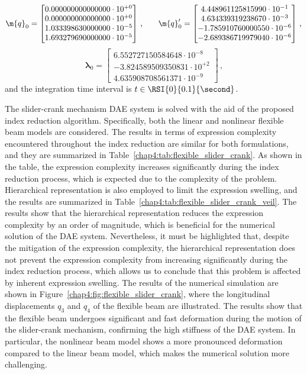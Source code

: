 \begin{equation*}
  \m{q}_{0} = \begin{bmatrix}
    0.000000000000000\cdot10^{+0} \\
    0.000000000000000\cdot10^{+0} \\
    1.033398630000000\cdot10^{-5} \\
    1.693279690000000\cdot10^{-5}
  \end{bmatrix} \, \text{,} \qquad
  \m{q}^{\prime}_{0} = \begin{bmatrix}
     4.448961125815990\cdot10^{-1} \\
     4.634339319238670\cdot10^{-3} \\
    -1.785910760000550\cdot10^{-6} \\
    -2.689386719979040\cdot10^{-6}
  \end{bmatrix} \, \text{,}
\end{equation*}
\begin{equation*}
  \bm{\lambda}_{0} = \begin{bmatrix}
     6.552727150584648\cdot10^{-8} \\
    -3.824589509350831\cdot10^{+2} \\
     4.635908708561371\cdot10^{-9}
  \end{bmatrix} \, \text{,}
\end{equation*}
%
and the integration time interval is $t \in \RSI{0}{0.1}{\second}$.

The slider-crank mechanism \ac{DAE} system is solved with the aid of the proposed index reduction algorithm. Specifically, both the linear and nonlinear flexible beam models are considered. The results in terms of expression complexity encountered throughout the index reduction are similar for both formulations, and they are summarized in Table~\ref{chap4:tab:flexible_slider_crank}. As shown in the table, the expression complexity increases significantly during the index reduction process, which is expected due to the complexity of the problem. Hierarchical representation is also employed to limit the expression swelling, and the results are summarized in Table~\ref{chap4:tab:flexible_slider_crank_veil}. The results show that the hierarchical representation reduces the expression complexity by an order of magnitude, which is beneficial for the numerical solution of the \ac{DAE} system. Nevertheless, it must be highlighted that, despite the mitigation of the expression complexity, the hierarchical representation does not prevent the expression complexity from increasing significantly during the index reduction process, which allows us to conclude that this problem is affected by inherent expression swelling. The results of the numerical simulation are shown in Figure~\ref{chap4:fig:flexible_slider_crank}, where the longitudinal displacements $q_3$ and $q_4$ of the flexible beam are illustrated. The results show that the flexible beam undergoes significant and fast deformation during the motion of the slider-crank mechanism, confirming the high stiffness of the \ac{DAE} system. In particular, the nonlinear beam model shows a more pronounced deformation compared to the linear beam model, which makes the numerical solution more challenging.

